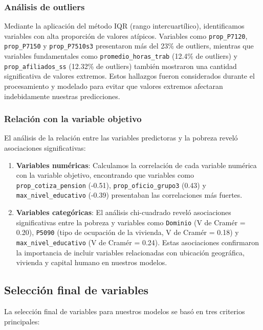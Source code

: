 \documentclass[12pt,a4paper,onecolumn]{article}
\begin{document}
\subsubsection{Análisis de outliers}

Mediante la aplicación del método IQR (rango intercuartílico), identificamos variables con alta proporción de valores atípicos. Variables como \texttt{prop\_P7120}, \texttt{prop\_P7150} y \texttt{prop\_P7510s3} presentaron más del 23\% de outliers, mientras que variables fundamentales como \texttt{promedio\_horas\_trab} (12.4\% de outliers) y \texttt{prop\_afiliados\_ss} (12.32\% de outliers) también mostraron una cantidad significativa de valores extremos. Estos hallazgos fueron considerados durante el procesamiento y modelado para evitar que valores extremos afectaran indebidamente nuestras predicciones.

\subsubsection{Relación con la variable objetivo}

El análisis de la relación entre las variables predictoras y la pobreza reveló asociaciones significativas:

\begin{enumerate}
   \item \textbf{Variables numéricas}: Calculamos la correlación de cada variable numérica con la variable objetivo, encontrando que variables como \texttt{prop\_cotiza\_pension} (-0.51), \texttt{prop\_oficio\_grupo3} (0.43) y \texttt{max\_nivel\_educativo} (-0.39) presentaban las correlaciones más fuertes.

   \item \textbf{Variables categóricas}: El análisis chi-cuadrado reveló asociaciones significativas entre la pobreza y variables como \texttt{Dominio} (V de Cramér = 0.20), \texttt{P5090} (tipo de ocupación de la vivienda, V de Cramér = 0.18) y \texttt{max\_nivel\_educativo} (V de Cramér = 0.24). Estas asociaciones confirmaron la importancia de incluir variables relacionadas con ubicación geográfica, vivienda y capital humano en nuestros modelos.
\end{enumerate}

\subsection{Selección final de variables}

La selección final de variables para nuestros modelos se basó en tres criterios principales:
\end{document}
